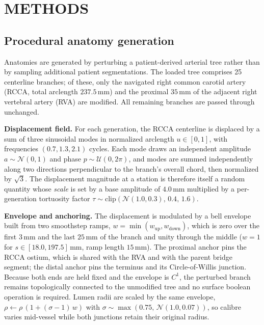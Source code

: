 %

\section{METHODS}

\subsection{Procedural anatomy generation}

Anatomies are generated by perturbing a patient-derived arterial tree rather than by
sampling additional patient segmentations. The loaded tree comprises 25 centerline
branches; of these, only the navigated right common carotid artery (RCCA, total arclength
$237.5$\,mm) and the proximal $35$\,mm of the adjacent right vertebral artery (RVA) are
modified. All remaining branches are passed through unchanged.

\textbf{Displacement field.} For each generation, the RCCA centerline is displaced by a sum
of three sinusoidal modes in normalized arclength $u \in [0,1]$, with frequencies
$(0.7, 1.3, 2.1)$ cycles. Each mode draws an independent amplitude $a \sim \mathcal{N}(0,1)$
and phase $p \sim \mathcal{U}(0, 2\pi)$, and modes are summed independently along two
directions perpendicular to the branch's overall chord, then normalized by $\sqrt{3}$. The
displacement magnitude at a station is therefore itself a random quantity whose \emph{scale}
is set by a base amplitude of $4.0$\,mm multiplied by a per-generation tortuosity factor
$\tau \sim \mathrm{clip}\!\left(\mathcal{N}(1.0, 0.3),\, 0.4,\, 1.6\right)$.

\textbf{Envelope and anchoring.} The displacement is modulated by a bell envelope built from
two smoothstep ramps, $w = \min(w_{\mathrm{up}}, w_{\mathrm{down}})$, which is zero over the
first $3$\,mm and the last $25$\,mm of the branch and unity through the middle ($w = 1$ for
$s \in [18.0, 197.5]$\,mm, ramp length $15$\,mm). The proximal anchor pins the RCCA ostium,
which is shared with the RVA and with the parent bridge segment; the distal anchor pins the
terminus and its Circle-of-Willis junction. Because both ends are held fixed and the envelope
is $C^{1}$, the perturbed branch remains topologically connected to the unmodified tree and no
surface boolean operation is required. Lumen radii are scaled by the same envelope,
$\rho \leftarrow \rho\,(1 + (\sigma - 1)\,w)$ with
$\sigma \sim \max\!\left(0.75,\, \mathcal{N}(1.0, 0.07)\right)$, so calibre varies mid-vessel
while both junctions retain their original radius.

